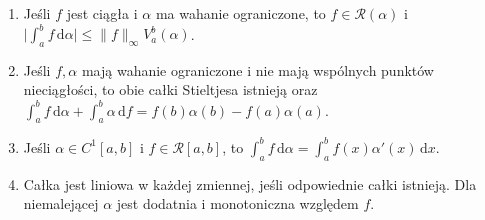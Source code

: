 \begin{twierdzenie}[Narzędzia]\label{it:thm:rs-tools}
\begin{enumerate}[label=(\alph*)]
\item Jeśli $f$ jest ciągła i $\alpha$ ma wahanie ograniczone, to $f\in\mathcal R(\alpha)$ i $\bigl|\int_a^b f\,\mathrm d\alpha\bigr|\le\|f\|_\infty V_a^b(\alpha)$.
\item Jeśli $f,\alpha$ mają wahanie ograniczone i nie mają wspólnych punktów nieciągłości, to obie całki Stieltjesa istnieją oraz
$\int_a^b f\,\mathrm d\alpha+\int_a^b\alpha\,\mathrm df=f(b)\alpha(b)-f(a)\alpha(a)$.
\item Jeśli $\alpha\in C^1[a,b]$ i $f\in\mathcal R[a,b]$, to $\int_a^b f\,\mathrm d\alpha=\int_a^b f(x)\alpha'(x)\,\mathrm dx$.
\item Całka jest liniowa w każdej zmiennej, jeśli odpowiednie całki istnieją. Dla niemalejącej $\alpha$ jest dodatnia i monotoniczna względem $f$.
\end{enumerate}
\end{twierdzenie}
